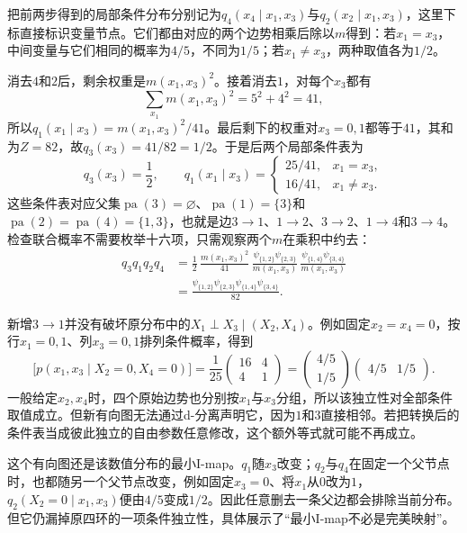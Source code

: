 把前两步得到的局部条件分布分别记为$q_4(x_4\mid x_1,x_3)$与$q_2(x_2\mid x_1,x_3)$，这里下标直接标识变量节点。它们都由对应的两个边势相乘后除以$m$得到：若$x_1=x_3$，中间变量与它们相同的概率为$4/5$，不同为$1/5$；若$x_1\ne x_3$，两种取值各为$1/2$。

消去$4$和$2$后，剩余权重是$m(x_1,x_3)^2$。接着消去$1$，对每个$x_3$都有
\[
  \sum_{x_1}m(x_1,x_3)^2=5^2+4^2=41,
\]
所以$q_1(x_1\mid x_3)=m(x_1,x_3)^2/41$。最后剩下的权重对$x_3=0,1$都等于$41$，其和为$Z=82$，故$q_3(x_3)=41/82=1/2$。于是后两个局部条件表为
\begin{equation}
  q_3(x_3)=\frac12,\qquad
  q_1(x_1\mid x_3)=
  \begin{cases}
    25/41,&x_1=x_3,\\
    16/41,&x_1\ne x_3.
  \end{cases}
  \label{eq:pgm-representations-cycle-root-tables}
\end{equation}
这些条件表对应父集$\operatorname{pa}(3)=\varnothing$、$\operatorname{pa}(1)=\{3\}$和$\operatorname{pa}(2)=\operatorname{pa}(4)=\{1,3\}$，也就是边$3\to1$、$1\to2$、$3\to2$、$1\to4$和$3\to4$。检查联合概率不需要枚举十六项，只需观察两个$m$在乘积中约去：
\[
  \begin{aligned}
    q_3q_1q_2q_4
    &=\frac12\,
      \frac{m(x_1,x_3)^2}{41}\,
      \frac{\psi_{\{1,2\}}\psi_{\{2,3\}}}{m(x_1,x_3)}\,
      \frac{\psi_{\{1,4\}}\psi_{\{3,4\}}}{m(x_1,x_3)}\\
    &=\frac{
      \psi_{\{1,2\}}\psi_{\{2,3\}}
      \psi_{\{1,4\}}\psi_{\{3,4\}}}{82}.
  \end{aligned}
\]

新增$3\to1$并没有破坏原分布中的$X_1\perp X_3\mid(X_2,X_4)$。例如固定$x_2=x_4=0$，按行$x_1=0,1$、列$x_3=0,1$排列条件概率，得到
\[
  \bigl[p(x_1,x_3\mid X_2=0,X_4=0)\bigr]
  =\frac1{25}
  \begin{pmatrix}16&4\\4&1\end{pmatrix}
  =
  \begin{pmatrix}4/5\\1/5\end{pmatrix}
  \begin{pmatrix}4/5&1/5\end{pmatrix}.
\]
一般给定$x_2,x_4$时，四个原始边势也分别按$x_1$与$x_3$分组，所以该独立性对全部条件取值成立。但新有向图无法通过d-分离声明它，因为$1$和$3$直接相邻。若把转换后的条件表当成彼此独立的自由参数任意修改，这个额外等式就可能不再成立。

这个有向图还是该数值分布的最小I-map。$q_1$随$x_3$改变；$q_2$与$q_4$在固定一个父节点时，也都随另一个父节点改变，例如固定$x_3=0$、将$x_1$从$0$改为$1$，$q_2(X_2=0\mid x_1,x_3)$便由$4/5$变成$1/2$。因此任意删去一条父边都会排除当前分布。但它仍漏掉原四环的一项条件独立性，具体展示了“最小I-map不必是完美映射”。

